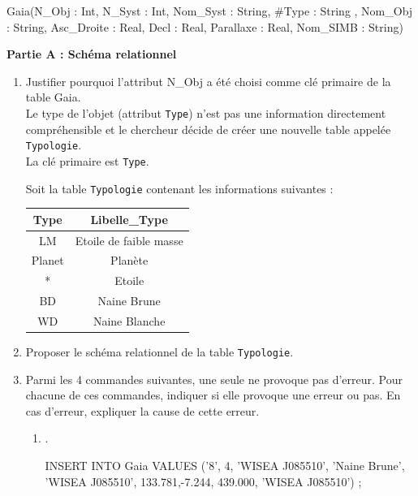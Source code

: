 \documentclass[12pt]{book}
\begin{document}
\begin{sql}
 Gaia(N_Obj : Int, N_Syst : Int, Nom_Syst : String, #Type : String , Nom_Obj : String,   Asc_Droite : Real, Decl : Real, Parallaxe : Real, Nom_SIMB : String)  
\end{sql}

\newpage

\textbf{Partie A : Schéma relationnel}

\begin{enumerate}
\item Justifier pourquoi l’attribut N\_Obj a été choisi comme clé primaire de la table Gaia.\\ 
Le type de l’objet (attribut {\tt Type}) n’est pas une information directement compréhensible et le chercheur décide de créer une nouvelle table appelée {\tt Typologie}.\\
La clé primaire est {\tt Type}.

Soit la table {\tt Typologie} contenant les informations suivantes : 

	\begin{center}
			{\footnotesize \begin{tabular}{|c|c|}
					\hline
					Type      & Libelle\_Type \\
					\hline
					LM   & Etoile de faible masse     \\
					\hline
					Planet & Planète       \\
					\hline
					*   & Etoile   \\
					\hline
					BD & Naine Brune       \\
					\hline
					WD & Naine Blanche      \\
					\hline
				\end{tabular}} \end{center}

\item Proposer le schéma relationnel de la table {\tt Typologie}.
\item Parmi les 4 commandes suivantes, une seule ne provoque pas d’erreur. Pour chacune de ces commandes, indiquer si elle provoque une erreur ou pas. En cas d’erreur, expliquer la cause de cette erreur.
\begin{enumerate}
\item .\\
\begin{sql}
INSERT INTO Gaia VALUES ('8', 4, 'WISEA J085510', 'Naine Brune', 'WISEA J085510', 133.781,-7.244, 439.000, 'WISEA J085510') ;
\end{sql}


\end{enumerate}
\end{enumerate}
\end{document}
